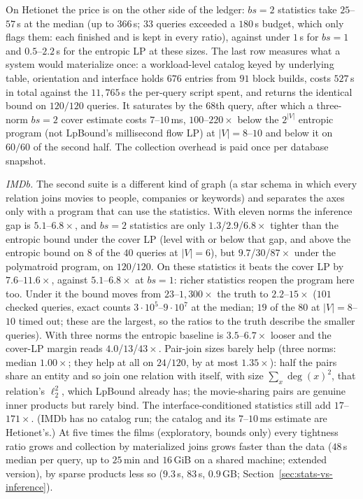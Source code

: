 \documentclass[conference]{IEEEtran}
\begin{document}
On Hetionet the
price is on the other side of the ledger: $bs{=}2$ statistics take $25$--$57$\,s at the median (up to
$366$\,s; $33$ queries exceeded a $180$\,s budget, which only flags them:
each finished and is kept in every ratio), against under $1$\,s for $bs{=}1$ and $0.5$--$2.2$\,s for the
entropic LP at these sizes. The last row measures what a system would materialize once: a workload-level catalog keyed by underlying
table, orientation and interface holds $676$ entries from $91$ block
builds, costs $527$\,s in total against the $11{,}765$\,s the per-query
script spent, and returns the identical bound on $120/120$ queries. It
saturates by the $68$th query, after which a three-norm $bs{=}2$ cover estimate costs $7$--$10$\,ms, $100$--$220\times$ below the $2^{|V|}$ entropic program (not LpBound's millisecond flow LP)
at $|V|{=}8$--$10$ and below it on $60/60$ of the second half. The
collection overhead is paid once per database snapshot.

\emph{IMDb.} The second suite is a different kind of graph (a star
schema in which every relation joins movies to people, companies or
keywords) and separates the axes only with a program that can use the
statistics. With eleven norms the inference gap is $5.1$--$6.8\times$, and
$bs{=}2$ statistics are only $1.3$/$2.9$/$6.8\times$ tighter than the
entropic bound under the cover LP (level with or below that gap, and
above the entropic bound on $8$ of the $40$ queries at $|V|{=}6$), but
$9.7$/$30$/$87\times$ under the polymatroid program, on $120/120$. On
these statistics it beats the cover LP by $7.6$--$11.6\times$, against
$5.1$--$6.8\times$ at $bs{=}1$: richer statistics reopen the program here
too. Under it the bound moves from $23$--$1{,}300\times$ the
truth to $2.2$--$15\times$ ($101$ checked queries, exact counts
$3{\cdot}10^{5}$--$9{\cdot}10^{7}$ at the median; $19$ of the $80$ at
$|V|{=}8$--$10$ timed out; these are the largest, so the ratios to the
truth describe the smaller queries). With three norms the entropic baseline is
$3.5$--$6.7\times$ looser and the cover-LP margin reads
$4.0$/$13$/$43\times$. Pair-join sizes barely help (three norms: median
$1.00\times$; they help at all on $24/120$, by at most $1.35\times$): half
the pairs share an entity and so join one relation with itself, with
size $\sum_x \deg(x)^2$, that relation's $\ell_2^2$, which LpBound already
has; the movie-sharing pairs are genuine inner products but rarely bind.
The interface-conditioned statistics still add $17$--$171\times$. (IMDb
has no catalog run; the catalog and its $7$--$10$\,ms
estimate are Hetionet's.) At five times the films (exploratory, bounds only) every tightness ratio grows and collection by materialized joins grows faster than the data ($48$\,s median per query, up to $25$\,min and $16$\,GiB on a shared machine; extended version), by sparse products less so ($9.3$\,s, $83$\,s, $0.9$\,GB; Section~\ref{sec:stats-vs-inference}).
\end{document}
